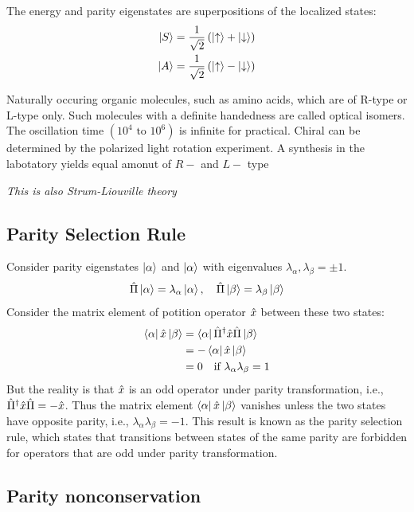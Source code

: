 The energy and parity eigenstates are superpositions of the localized states: 
\begin{align}
    \ket S &= \frac{1}{\sqrt 2} \left( \ket{\uparrow} + \ket{\downarrow} \right) \\
    \ket A &= \frac{1}{\sqrt 2} \left( \ket{\uparrow} - \ket{\downarrow} \right)
\end{align}

Naturally occuring organic molecules, such as amino acids, which are of R-type or L-type only. Such molecules with a definite handedness are called optical isomers. The oscillation time $(10^4 \text{ to } 10^6)$ is infinite for practical. Chiral can be determined by the polarized light rotation experiment. A synthesis in the labotatory yields equal amonut of $R-$ and $L-$ type

\emph{This is also Strum-Liouville theory}

\subsection{Parity Selection Rule}

Consider parity eigenstates $\ket \alpha$ and $\ket \alpha$ with eigenvalues $\lambda_{\alpha}, \lambda_{\beta} = \pm 1$. 
\begin{align}
    \hat{\Pi} \ket \alpha = \lambda_{\alpha} \ket \alpha, \quad \hat{\Pi} \ket \beta = \lambda_{\beta} \ket \beta
\end{align}
Consider the matrix element of potition operator $\hat{x}$ between these two states:
\begin{align}
    \bra \alpha \hat{x} \ket \beta &= \bra \alpha \hat{\Pi}^ \dag \hat{x} \hat{\Pi} \ket \beta \notag \\
    &= - \bra \alpha \hat{x} \ket \beta \notag \\
    & = 0 \quad \text{if } \lambda_{\alpha} \lambda_{\beta} = 1
\end{align}
But the reality is that $\hat{x}$ is an odd operator under parity transformation, i.e., $\hat{\Pi}^ \dag \hat{x} \hat{\Pi} = - \hat{x}$. Thus the matrix element $\bra \alpha \hat{x} \ket \beta$ vanishes unless the two states have opposite parity, i.e., $\lambda_{\alpha} \lambda_{\beta} = -1$. This result is known as the parity selection rule, which states that transitions between states of the same parity are forbidden for operators that are odd under parity transformation.

\subsection{Parity nonconservation}

